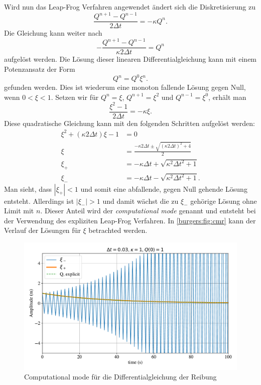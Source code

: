 	\medskip
	Wird nun das Leap-Frog Verfahren angewendet \"andert sich die Diskretisierung zu
	\begin{equation}
		\frac{Q^{n+1}-Q^{n-1}}{2 \Delta t} = - \kappa Q^n.
	\end{equation}
	Die Gleichung kann weiter nach
	\begin{equation}
		-\frac{Q^{n+1}-Q^{n-1}}{\kappa 2 \Delta t} = Q^n
	\end{equation}
	aufgelöst werden.
	Die Lösung dieser linearen Differentialgleichung kann mit einem Potenzansatz der Form
		\begin{equation}
			Q^n = Q^0\xi ^n.
			\label{burgers:eq_cm}
		\end{equation}
	gefunden werden.
	Dies ist wiederum eine monoton fallende L\"osung gegen Null, wenn $0 < \xi < 1$.
	Setzen wir f\"ur $Q^n = \xi$, $Q^{n+1} = \xi^2$ und $Q^{n-1} = \xi^0$,
	erhält man
	\begin{equation}
		\frac{\xi^2 -1}{2\Delta t} =  -\kappa \xi.
	\end{equation}
    Diese quadratische Gleichung kann mit den folgenden Schritten aufgelöst werden:
\begin{subequations}
    \begin{align}
            \xi^2 + (\kappa 2 \Delta t) \xi  -1 &= 0 \\
            \xi &= \frac{- \kappa 2 \Delta t \pm \sqrt{(\kappa 2 \Delta t)^2 + 4}}{2}\\
            \xi_+ &= - \kappa\Delta t + \sqrt{\kappa^2 \Delta t^2 + 1}\\
            \xi_- &= - \kappa\Delta t - \sqrt{\kappa^2 \Delta t^2 + 1}.
        \end{align}
    \end{subequations}
	Man sieht, dass $|\xi_+| < 1$ und somit eine abfallende, gegen Null gehende L\"osung entsteht.
	Allerdings ist 	$|\xi_-| > 1$ und damit w\"achst die zu $\xi_-$ gehörige Lösung ohne Limit mit $n$.
	Dieser Anteil wird der  \textit{computational mode} genannt und entsteht bei der Verwendung des expliziten Leap-Frog Verfahren.
%
	In \autoref{burgers:fig:cmr} kann der Verlauf der Lösungen für $\xi$ betrachted werden.
	\begin{figure}
	\centering
	\includegraphics[width=1\textwidth]{papers/burgers/BurgersEquation/comp_mode.pdf}
	\caption{Computational mode für die Differentialgleichung der Reibung}
	\label{burgers:fig:cmr}
	\end{figure}

